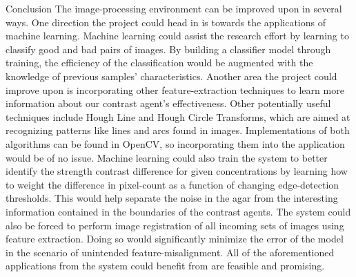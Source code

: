 \documentclass[a4paper,12pt]{article}
\begin{document}
\begin{section}{Conclusion}
The image-processing environment can be improved upon in several ways. One direction the project could head in is towards the applications of machine learning. Machine learning could assist the research effort by learning to classify good and bad pairs of images. By building a classifier model through training, the efficiency of the classification would be augmented with the knowledge of previous samples' characteristics. Another area the project could improve upon is incorporating other feature-extraction techniques to learn more information about our contrast agent's effectiveness. Other potentially useful techniques include Hough Line and Hough Circle Transforms, which are aimed at recognizing patterns like lines and arcs found in images. Implementations of both algorithms can be found in OpenCV, so incorporating them into the application would be of no issue. Machine learning could also train the system to better identify the strength contrast difference for given concentrations by learning how to weight the difference in pixel-count as a function of changing edge-detection thresholds. This would help separate the noise in the agar from the interesting information contained in the boundaries of the contrast agents. The system could also be forced to perform image registration of all incoming sets of images using feature extraction. Doing so would significantly minimize the error of the model in the scenario of unintended feature-misalignment. All of the aforementioned applications from the system could benefit from are feasible and promising.

\end{section}
\end{document}
